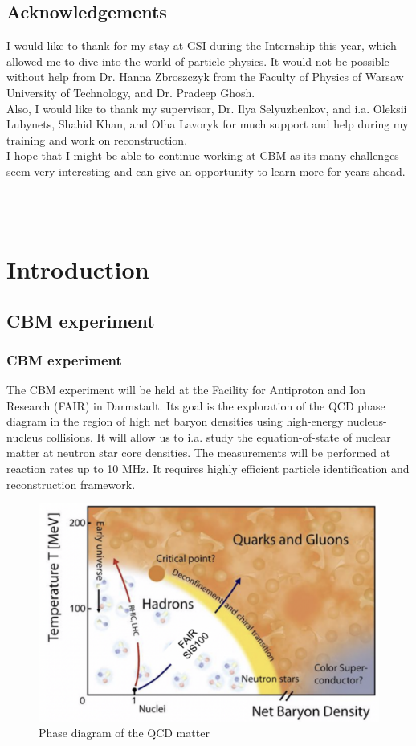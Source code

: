\documentclass[12pt,a4paper]{report}
\begin{document}
\section*{Acknowledgements}
I would like to thank for my stay at GSI during the Internship this year, which allowed me to dive into the world of particle physics. It would not be possible without help from  Dr. Hanna Zbroszczyk from the Faculty of Physics of Warsaw University of Technology, and Dr.  Pradeep Ghosh. \\Also, I would like to thank my supervisor, Dr. Ilya Selyuzhenkov, and i.a. Oleksii Lubynets, Shahid Khan, and Olha Lavoryk for much support and help during my training and work on \PKshort reconstruction.\\I hope that I might be able to continue working at CBM as its many challenges seem very interesting and can give an opportunity to learn more for years ahead.
\newpage
~ %
\newpage

\tableofcontents %
\newpage
\listoffigures %
\newpage
\listoftables %
\newpage
~ %
\newpage


\chapter{Introduction}
\section{CBM experiment}
\subsection{CBM experiment}
The CBM experiment will be held at the Facility for Antiproton and Ion Research (FAIR) in Darmstadt. Its goal is the exploration of the QCD phase diagram in the region of high net baryon densities using high-energy nucleus-nucleus collisions. It will allow us to i.a. study the equation-of-state of nuclear matter at neutron star core densities. The measurements will be performed at reaction rates up to 10 MHz. It requires highly efficient particle identification and reconstruction framework.\cite{cbm-experiment}
\begin{figure}[H]
    \centering
    \includegraphics[width=.7\textwidth]{images/phase_diagram.png}
    \caption{Phase diagram of the QCD matter \cite{progress report}}
    \label{phase_diagram}
\end{figure}
\end{document}
